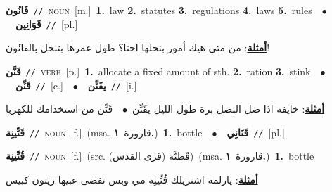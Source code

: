 \documentclass[10pt,a4paper,twoside]{article} %
\begin{document}
\begin{multicols}{2}
{\setlength\topsep{0pt}\textbf{\foreignlanguage{arabic}{قَانُون}}\ {\color{gray}\texttt{//}\color{black}}\ \textsc{noun}\ [m.]\ \textbf{1.}~law  \textbf{2.}~statutes  \textbf{3.}~regulations  \textbf{4.}~laws  \textbf{5.}~rules\ \ $\bullet$\ \ \setlength\topsep{0pt}\textbf{\foreignlanguage{arabic}{قَوَانِين}}\ {\color{gray}\texttt{//}\color{black}}\ [pl.]\  \begin{flushright}\color{gray}\foreignlanguage{arabic}{\textbf{\underline{\foreignlanguage{arabic}{أمثلة}}}: من متى هيك أمور بنحلها احنا؟ طول عمرها بتنحل بالقانُون!}\end{flushright}\color{black}} \vspace{2mm}

{\setlength\topsep{0pt}\textbf{\foreignlanguage{arabic}{قَنَّن}}\ {\color{gray}\texttt{//}\color{black}}\ \textsc{verb}\ [p.]\ \textbf{1.}~allocate a fixed amount of sth.  \textbf{2.}~ration  \textbf{3.}~stink\ \ $\bullet$\ \ \setlength\topsep{0pt}\textbf{\foreignlanguage{arabic}{قَنِّن}}\ {\color{gray}\texttt{//}\color{black}}\ [c.]\ \ $\bullet$\ \ \setlength\topsep{0pt}\textbf{\foreignlanguage{arabic}{يقَنِّن}}\ {\color{gray}\texttt{//}\color{black}}\ [i.]\  \begin{flushright}\color{gray}\foreignlanguage{arabic}{\textbf{\underline{\foreignlanguage{arabic}{أمثلة}}}: خايفة اذا ضل البصل برة طول الليل يقَنِّن\ $\bullet$\ \  قَنِّن من استخدامك للكهربا}\end{flushright}\color{black}} \vspace{2mm}

{\setlength\topsep{0pt}\textbf{\foreignlanguage{arabic}{قَنِّينِة}}\ {\color{gray}\texttt{//}\color{black}}\ \textsc{noun}\ [f.]\ \color{gray}(msa. \foreignlanguage{arabic}{قارورة}~\foreignlanguage{arabic}{\textbf{١.}})\color{black}\ \textbf{1.}~bottle\ \ $\bullet$\ \ \setlength\topsep{0pt}\textbf{\foreignlanguage{arabic}{قَنَانِي}}\ {\color{gray}\texttt{//}\color{black}}\ [pl.]\ } \vspace{2mm}

{\setlength\topsep{0pt}\textbf{\foreignlanguage{arabic}{قُنِّينِة}}\ {\color{gray}\texttt{//}\color{black}}\ \textsc{noun}\ [f.]\ (src. \color{gray}\foreignlanguage{arabic}{قَطنَّة (قرى القدس)}\color{black})\ \color{gray}(msa. \foreignlanguage{arabic}{قارورة}~\foreignlanguage{arabic}{\textbf{١.}})\color{black}\ \textbf{1.}~bottle\  \begin{flushright}\color{gray}\foreignlanguage{arabic}{\textbf{\underline{\foreignlanguage{arabic}{أمثلة}}}: يازلمة اشتريلك قُنِّينِة مي وبس تفضى عبيها زيتون كبيس}\end{flushright}\color{black}} \vspace{2mm}


\end{multicols}
\end{document}

